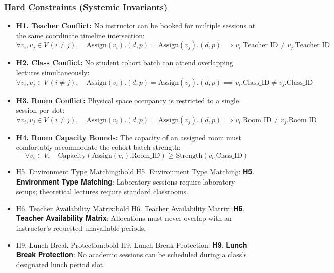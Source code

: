 \documentclass[11pt,a4paper]{article}
\begin{document}
\subsubsection{Hard Constraints (Systemic Invariants)}
\begin{itemize}
\item \textbf{H1. Teacher Conflict:} No instructor can be booked for multiple sessions at the same coordinate timeline intersection: \def\Assign{\text{Assign}} \begin{equation} \forall v_i, v_j \in V \, (i \neq j), \quad \Assign(v_i).(d, p) = \Assign(v_j).(d, p) \implies v_i.\text{Teacher\_ID} \neq v_j.\text{Teacher\_ID} \end{equation}
\item \textbf{H2. Class Conflict:} No student cohort batch can attend overlapping lectures simultaneously: \begin{equation} \forall v_i, v_j \in V \, (i \neq j), \quad \Assign(v_i).(d, p) = \Assign(v_j).(d, p) \implies v_i.\text{Class\_ID} \neq v_j.\text{Class\_ID} \end{equation}
\item \textbf{H3. Room Conflict:} Physical space occupancy is restricted to a single session per slot: \begin{equation} \forall v_i, v_j \in V \, (i \neq j), \quad \Assign(v_i).(d, p) = \Assign(v_j).(d, p) \implies v_i.\text{Room\_ID} \neq v_j.\text{Room\_ID} \end{equation}
\item \textbf{H4. Room Capacity Bounds:} The capacity of an assigned room must comfortably accommodate the cohort batch strength: \begin{equation} \forall v_i \in V, \quad \text{Capacity}(\Assign(v_i).\text{Room\_ID}) \geq \text{Strength}(v_i.\text{Class\_ID}) \end{equation}
\item 

H5. Environment Type Matching:bold H5. Environment Type Matching:
𝐇𝟓. 𝐄𝐧𝐯𝐢𝐫𝐨𝐧𝐦𝐞𝐧𝐭 𝐓𝐲𝐩𝐞 𝐌𝐚𝐭𝐜𝐡𝐢𝐧𝐠:
 Laboratory sessions require laboratory setups; theoretical lectures require standard classrooms.
\item 

H6. Teacher Availability Matrix:bold H6. Teacher Availability Matrix:
𝐇𝟔. 𝐓𝐞𝐚𝐜𝐡𝐞𝐫 𝐀𝐯𝐚𝐢𝐥𝐚𝐛𝐢𝐥𝐢𝐭𝐲 𝐌𝐚𝐭𝐫𝐢𝐱:
 Allocations must never overlap with an instructor's requested unavailable periods.
\item 

H9. Lunch Break Protection:bold H9. Lunch Break Protection:
𝐇𝟗. 𝐋𝐮𝐧𝐜𝐡 𝐁𝐫𝐞𝐚𝐤 𝐏𝐫𝐨𝐭𝐞𝐜𝐭𝐢𝐨𝐧:
 No academic sessions can be scheduled during a class's designated lunch period slot.
\end{itemize} 
\end{document}

